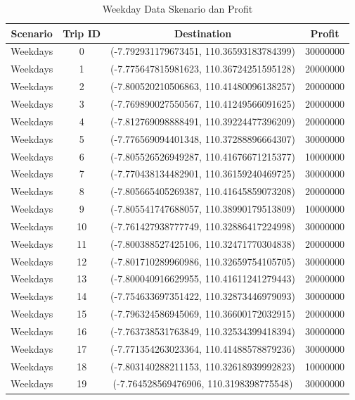 \documentclass{skripsimathugm}
\begin{document}
\begin{table}[H]
\centering
\caption{Weekday Data Skenario dan Profit}
\label{Weekday Data Skenario dan Profit}
\begin{tabular}{|c|c|c|c|}
\hline
\textbf{Scenario} & \textbf{Trip ID} & \textbf{Destination} & \textbf{Profit} \\
\hline

Weekdays & 0 & (-7.792931179673451, 110.36593183784399) & 30000000 \\
Weekdays & 1 & (-7.775647815981623, 110.36724251595128) & 20000000 \\
Weekdays & 2 & (-7.800520210506863, 110.41480096138257) & 20000000 \\
Weekdays & 3 & (-7.769890027550567, 110.41249566091625) & 20000000 \\
Weekdays & 4 & (-7.812769098888491, 110.39224477396209) & 20000000 \\
Weekdays & 5 & (-7.776569094401348, 110.37288896664307) & 30000000 \\
Weekdays & 6 & (-7.805526526949287, 110.41676671215377) & 10000000 \\
Weekdays & 7 & (-7.770438134482901, 110.36159240469725) & 30000000 \\
Weekdays & 8 & (-7.805665405269387, 110.41645859073208) & 20000000 \\
Weekdays & 9 & (-7.805541747688057, 110.38990179513809) & 10000000 \\
Weekdays & 10 & (-7.761427938777749, 110.32886417224998) & 30000000 \\
Weekdays & 11 & (-7.800388527425106, 110.32471770304838) & 20000000 \\
Weekdays & 12 & (-7.801710289960986, 110.32659754105705) & 30000000 \\
Weekdays & 13 & (-7.800040916629955, 110.41611241279443) & 20000000 \\
Weekdays & 14 & (-7.754633697351422, 110.32873446979093) & 30000000 \\
Weekdays & 15 & (-7.796324586945069, 110.36600172032915) & 20000000 \\
Weekdays & 16 & (-7.763738531763849, 110.32534399418394) & 30000000 \\
Weekdays & 17 & (-7.771354263023364, 110.41488578879236) & 30000000 \\
Weekdays & 18 & (-7.803140288211153, 110.32618939992823) & 10000000 \\
Weekdays & 19 & (-7.764528569476906, 110.3198398775548) & 30000000 \\

\end{tabular}
\end{table}
\end{document}
